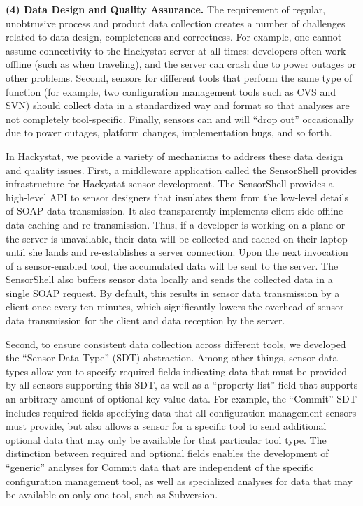 \documentclass[10pt,twocolumn]{article}
\begin{document}
{\bf (4) Data Design and Quality Assurance.} The requirement of regular, unobtrusive
process and product data collection creates a number of challenges related
to data design, completeness and correctness.  For example, one cannot assume
connectivity to the Hackystat server at all times: developers often work
offline (such as when traveling), and the server can crash due to power
outages or other problems.  Second, sensors for different tools that
perform the same type of function (for example, two configuration
management tools such as CVS and SVN) should collect data in a standardized
way and format so that analyses are not completely tool-specific. Finally,
sensors can and will ``drop out'' occasionally due to power outages,
platform changes, implementation bugs, and so forth.

In Hackystat, we provide a variety of mechanisms to address these data design and 
quality issues.  First, a middleware application called the SensorShell
provides infrastructure for Hackystat sensor development.  The SensorShell
provides a high-level API to sensor designers that insulates them from the
low-level details of SOAP data transmission. It also transparently
implements client-side offline data caching and re-transmission.  Thus, if
a developer is working on a plane or the server is unavailable, their data
will be collected and cached on their laptop until she lands and
re-establishes a server connection.  Upon the next invocation of a
sensor-enabled tool, the accumulated data will be sent to the server.  The
SensorShell also buffers sensor data locally and sends the collected data
in a single SOAP request. By default, this results in sensor data
transmission by a client once every ten minutes, which significantly lowers
the overhead of sensor data transmission for the client and data reception
by the server.

Second, to ensure consistent data collection across different tools, we
developed the ``Sensor Data Type'' (SDT) abstraction.  Among other things,
sensor data types allow you to specify required fields indicating data that
must be provided by all sensors supporting this SDT, as well as a
``property list'' field that supports an arbitrary amount of optional
key-value data.  For example, the ``Commit'' SDT includes required fields
specifying data that all configuration management sensors must provide, but
also allows a sensor for a specific tool to send additional optional data
that may only be available for that particular tool type. The distinction
between required and optional fields enables the development of ``generic''
analyses for Commit data that are independent of the specific configuration
management tool, as well as specialized analyses for data that may be
available on only one tool, such as Subversion.
\end{document}
